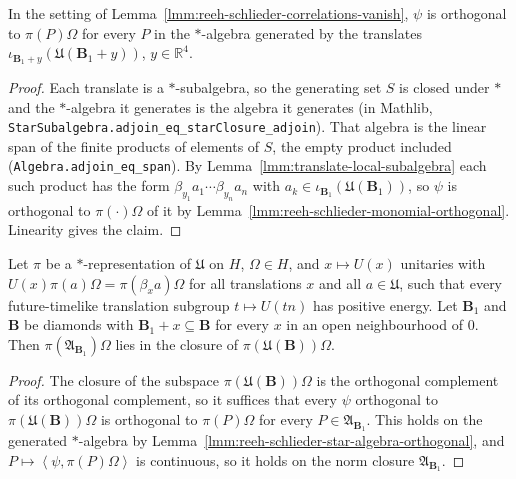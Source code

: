 \begin{lemma}
    \label{lmm:reeh-schlieder-star-algebra-orthogonal}
    \leanok
    In the setting of Lemma~\ref{lmm:reeh-schlieder-correlations-vanish}, $\psi$ is orthogonal to $\pi(P)\Omega$ for every $P$ in the $*$-algebra generated by the translates $\iota_{\mathbf{B}_1 + y}(\mathfrak{U}(\mathbf{B}_1 + y))$, $y \in \mathbb{R}^4$.
\end{lemma}
\begin{proof}
    \leanok
    Each translate is a $*$-subalgebra, so the generating set $S$ is closed under $*$ and the $*$-algebra it generates is the algebra it generates (in Mathlib, \texttt{StarSubalgebra.adjoin\_eq\_starClosure\_adjoin}). That algebra is the linear span of the finite products of elements of $S$, the empty product included (\texttt{Algebra.adjoin\_eq\_span}). By Lemma~\ref{lmm:translate-local-subalgebra} each such product has the form $\beta_{y_1}a_1 \cdots \beta_{y_n}a_n$ with $a_k \in \iota_{\mathbf{B}_1}(\mathfrak{U}(\mathbf{B}_1))$, so $\psi$ is orthogonal to $\pi(\cdot)\Omega$ of it by Lemma~\ref{lmm:reeh-schlieder-monomial-orthogonal}. Linearity gives the claim.
\end{proof}

\begin{theorem}
    \label{thrm:reeh-schlieder}
    \leanok
    Let $\pi$ be a $*$-representation of $\mathfrak{U}$ on $H$, $\Omega \in H$, and $x \mapsto U(x)$ unitaries with $U(x)\pi(a)\Omega = \pi(\beta_x a)\Omega$ for all translations $x$ and all $a \in \mathfrak{U}$, such that every future-timelike translation subgroup $t \mapsto U(tn)$ has positive energy. Let $\mathbf{B}_1$ and $\mathbf{B}$ be diamonds with $\mathbf{B}_1 + x \subseteq \mathbf{B}$ for every $x$ in an open neighbourhood of $0$. Then $\pi(\mathfrak{A}_{\mathbf{B}_1})\Omega$ lies in the closure of $\pi(\mathfrak{U}(\mathbf{B}))\Omega$.
\end{theorem}
\begin{proof}
    \leanok
    The closure of the subspace $\pi(\mathfrak{U}(\mathbf{B}))\Omega$ is the orthogonal complement of its orthogonal complement, so it suffices that every $\psi$ orthogonal to $\pi(\mathfrak{U}(\mathbf{B}))\Omega$ is orthogonal to $\pi(P)\Omega$ for every $P \in \mathfrak{A}_{\mathbf{B}_1}$. This holds on the generated $*$-algebra by Lemma~\ref{lmm:reeh-schlieder-star-algebra-orthogonal}, and $P \mapsto \left< \psi, \pi(P)\Omega \right>$ is continuous, so it holds on the norm closure $\mathfrak{A}_{\mathbf{B}_1}$.
\end{proof}

